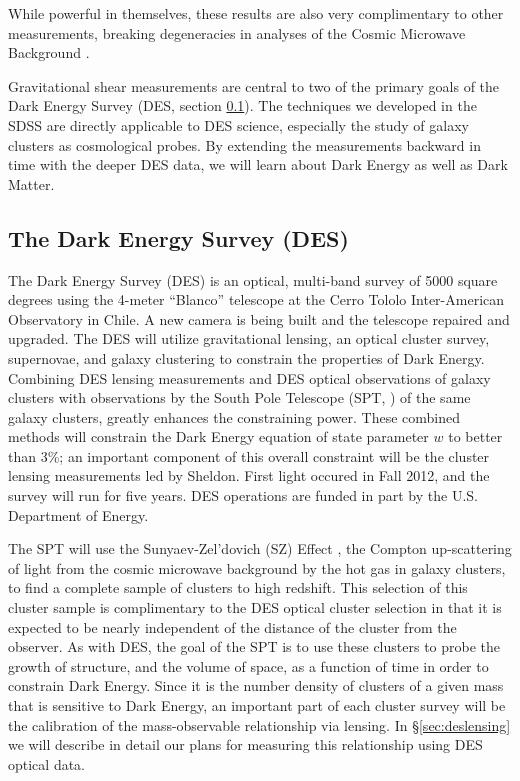 \documentclass[12pt]{article}
\newcommand{\commissdate}{Fall 2012}
\begin{document}
While powerful in themselves, these results are also very complimentary to
other measurements, breaking degeneracies in analyses of the Cosmic Microwave
Background \cite{KomatsuWMAPCosmo09}. 

Gravitational shear measurements are central to two of the primary goals of the
Dark Energy Survey (DES, section \ref{sec:des}).  The techniques we developed
in the SDSS are directly applicable to DES science, especially the study of
galaxy clusters as cosmological probes.  By extending the measurements backward
in time with the deeper DES data, we will learn about Dark Energy as well as
Dark Matter.


\subsection{The Dark Energy Survey (DES)} \label{sec:des}

The Dark Energy Survey (DES) is an optical, multi-band survey of 5000 square
degrees using the 4-meter ``Blanco'' telescope at the Cerro Tololo
Inter-American Observatory in Chile. A new camera is being built and the
telescope repaired and upgraded.  The DES will utilize gravitational lensing,
an optical cluster survey, supernovae, and galaxy clustering to constrain the
properties of Dark Energy.  Combining DES lensing measurements and DES optical
observations of galaxy clusters with observations by the South Pole Telescope
(SPT, \cite{SPT04}) of the same galaxy clusters, greatly enhances the
constraining power.  These combined methods will constrain the Dark Energy
equation of state parameter $w$ to better than 3\%; an important component of
this overall constraint will be the cluster lensing measurements led by
Sheldon.  First light occured in \commissdate, and the survey will run for five
years.  DES operations are funded in part by the U.S. Department of Energy. 


The SPT will use the Sunyaev-Zel'dovich (SZ) Effect \cite{Birkinshaw99}, the
Compton up-scattering of light from the cosmic microwave background by the hot
gas in galaxy clusters, to find a complete sample of clusters to high redshift.
This selection of this cluster sample is complimentary to the DES optical
cluster selection in that it is expected to be nearly independent of the
distance of the cluster from the observer.  As with DES, the goal of the SPT is
to use these clusters to probe the growth of structure, and the volume of
space, as a function of time in order to constrain Dark Energy.  Since it is
the number density of clusters of a given mass that is sensitive to Dark
Energy, an important part of each cluster survey will be the calibration of the
mass-observable relationship via lensing.  In \S \ref{sec:deslensing} we will
describe in detail our plans for measuring this relationship using DES optical
data.
\end{document}

